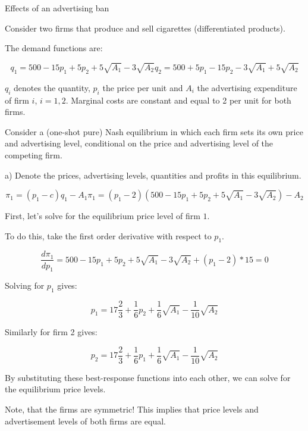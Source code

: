 \documentclass[12pt,english]{article}%
\begin{document}
Effects of an advertising ban

Consider two firms that produce and sell cigarettes (differentiated products).

The demand functions are:

\begin{equation}
q_1=500-15p_1+5p_2+5\sqrt{A_1}-3\sqrt{A_2}
q_2=500+5p_1-15p_2-3\sqrt{A_1}+5\sqrt{A_2}
\end{equation}

$q_i$ denotes the quantity, $p_i$ the price per unit and $A_i$ the advertising expenditure of firm $i$, $i=1,2$.
Marginal costs are constant and equal to 2 per unit for both firms. 

Consider a (one-shot pure) Nash equilibrium in which each firm sets its own price and advertising level, conditional on the price and advertising level of the competing firm. 

a) Denote the prices, advertising levels, quantities and profits in this equilibrium.

\begin{equation}
\pi_1=(p_1-c)q_1-A_1
\pi_1=(p_1-2)(500-15p_1+5p_2+5\sqrt{A_1}-3\sqrt{A_2})-A_2
\end{equation}

First, let's solve for the equilibrium price level of firm $1$.
 
To do this, take the first order derivative with respect to $p_1$.

\begin{equation}
\frac{d\pi_1}{dp_1}=500-15p_1+5p_2+5\sqrt{A_1}-3\sqrt{A_2}+(p_1-2)*15=0
\end{equation}

Solving for $p_1$ gives:

\begin{equation}
p_1=17\frac{2}{3}+\frac{1}{6}p_2+\frac{1}{6}\sqrt{A_1}-\frac{1}{10}\sqrt{A_2}
\end{equation}

Similarly for firm 2 gives:

\begin{equation}
p_2=17\frac{2}{3}+\frac{1}{6}p_1+\frac{1}{6}\sqrt{A_1}-\frac{1}{10}\sqrt{A_2}
\end{equation}

By substituting these best-response functions into each other, we can solve for the equilibrium price levels. 

Note, that the firms are symmetric! This implies that price levels and advertisement levels of both firms are equal. 
\end{document}
